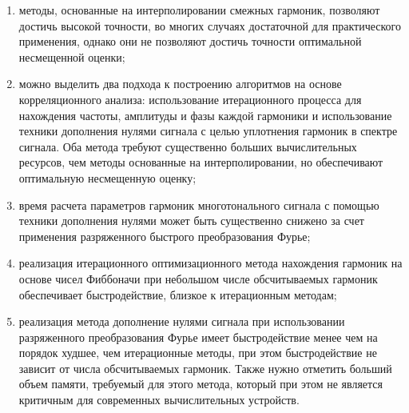 \begin{enumerate}
\item методы, основанные на интерполировании смежных гармоник, позволяют достичь высокой точности, во многих случаях достаточной для практического применения, однако они не позволяют достичь точности оптимальной несмещенной оценки;

\item можно выделить два подхода к построению алгоритмов на основе корреляционного анализа: использование итерационного процесса для нахождения частоты, амплитуды и фазы каждой гармоники и использование техники дополнения нулями сигнала с целью уплотнения гармоник в спектре сигнала. Оба метода требуют существенно больших вычислительных ресурсов, чем методы основанные на интерполировании, но обеспечивают оптимальную несмещенную оценку;

\item время расчета параметров гармоник многотонального сигнала с помощью техники дополнения нулями может быть существенно снижено за счет применения разряженного быстрого преобразования Фурье;

\item реализация итерационного оптимизационного метода нахождения гармоник на основе чисел Фиббоначи при небольшом числе обсчитываемых гармоник обеспечивает быстродействие, близкое к итерационным методам; 

\item реализация метода дополнение нулями сигнала при использовании разряженного преобразования Фурье имеет быстродействие менее чем на порядок худшее, чем итерационные методы, при этом быстродействие не зависит от числа обсчитываемых гармоник. Также нужно отметить больший объем памяти, требуемый для этого метода, который при этом не является критичным для современных вычислительных устройств.
\end{enumerate}
